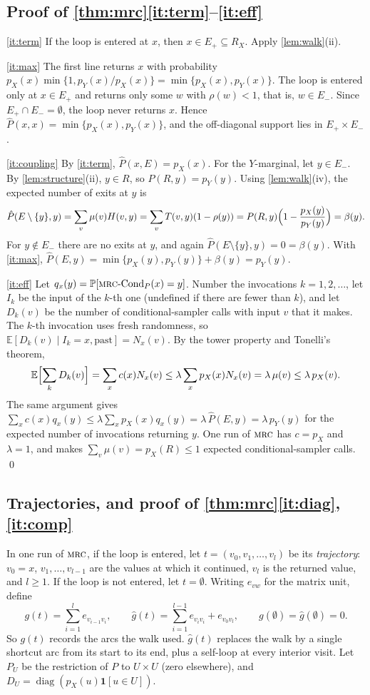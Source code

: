 \documentclass[11pt]{article}
\theoremstyle{definition}
\newcommand{\pX}{p_X}
\newcommand{\pY}{p_Y}
\newcommand{\hP}{\hat P}
\newcommand{\Ep}{E_{+}}
\newcommand{\Em}{E_{-}}
\newcommand{\one}{\mathbf{1}}
\newcommand{\MRC}{\textnormal{\textsc{mrc}}}
\renewcommand{\Pr}{\mathbb{P}}
\newcommand{\Ex}{\mathbb{E}}
\begin{document}
\subsection{Proof of \texorpdfstring{\cref{thm:mrc}\ref{it:term}--\ref{it:eff}}{the main theorem, parts (a)--(d)}}

\ref{it:term} If the loop is entered at $x$, then $x\in\Ep\subseteq R_X$. Apply
\cref{lem:walk}(ii).

\ref{it:max} The first line returns $x$ with probability
$\pX(x)\min\{1,\pY(x)/\pX(x)\}=\min\{\pX(x),\pY(x)\}$. The loop is entered only
at $x\in\Ep$ and returns only some $w$ with $\rho(w)<1$, that is, $w\in\Em$.
Since $\Ep\cap\Em=\emptyset$, the loop never returns $x$. Hence
$\hP(x,x)=\min\{\pX(x),\pY(x)\}$, and the off-diagonal support lies in
$\Ep\times\Em$.

\ref{it:coupling} By \ref{it:term}, $\hP(x,E)=\pX(x)$. For the $Y$-marginal, let
$y\in\Em$. By \cref{lem:structure}(ii), $y\in R$, so $P(R,y)=\pY(y)$. Using
\cref{lem:walk}(iv), the expected number of exits at $y$ is
\[
  \hP(E\setminus\{y\},y)=\sum_v\mu(v)H(v,y)=\sum_vT(v,y)(1-\rho(y))=P(R,y)\Bigl(1-\frac{\pX(y)}{\pY(y)}\Bigr)=\beta(y).
\]
For $y\notin\Em$ there are no exits at $y$, and again
$\hP(E\setminus\{y\},y)=0=\beta(y)$. With \ref{it:max},
$\hP(E,y)=\min\{\pX(y),\pY(y)\}+\beta(y)=\pY(y)$.

\ref{it:eff} Let $q_x(y)=\Pr[\MRC\text{-Cond}_P(x)=y]$. Number the invocations
$k=1,2,\dots$, let $I_k$ be the input of the $k$-th one (undefined if there are
fewer than $k$), and let $D_k(v)$ be the number of conditional-sampler calls
with input $v$ that it makes. The $k$-th invocation uses fresh randomness, so
$\Ex[D_k(v)\mid I_k=x,\text{past}]=N_x(v)$. By the tower property and Tonelli's
theorem,
\[
  \Ex\Bigl[\sum_kD_k(v)\Bigr]=\sum_x c(x)N_x(v)\le\lambda\sum_x\pX(x)N_x(v)=\lambda\,\mu(v)\le\lambda\,\pX(v).
\]
The same argument gives $\sum_xc(x)q_x(y)\le\lambda\sum_x\pX(x)q_x(y)=\lambda\,\hP(E,y)=\lambda\,\pY(y)$
for the expected number of invocations returning $y$. One run of $\MRC$ has
$c=\pX$ and $\lambda=1$, and makes $\sum_v\mu(v)=\pX(R)\le1$ expected
conditional-sampler calls. \qed

\subsection{Trajectories, and proof of \texorpdfstring{\cref{thm:mrc}\ref{it:diag},\ref{it:comp}}{the main theorem, parts (e,f)}}

In one run of $\MRC$, if the loop is entered, let $t=(v_0,v_1,\dots,v_l)$ be its
\emph{trajectory}: $v_0=x$, $v_1,\dots,v_{l-1}$ are the values at which it
continued, $v_l$ is the returned value, and $l\ge1$. If the loop is not entered,
let $t=\emptyset$. Writing $e_{vw}$ for the matrix unit, define
\[
  g(t)=\sum_{i=1}^{l}e_{v_{i-1}v_i},\qquad
  \hat g(t)=\sum_{i=1}^{l-1}e_{v_iv_i}+e_{v_0v_l},\qquad g(\emptyset)=\hat g(\emptyset)=0.
\]
So $g(t)$ records the arcs the walk used. $\hat g(t)$ replaces the walk by a
single shortcut arc from its start to its end, plus a self-loop at every
interior visit. Let $P_U$ be the restriction of $P$ to $U\times U$ (zero
elsewhere), and $D_U=\operatorname{diag}(\pX(u)\one[u\in U])$.
\end{document}
